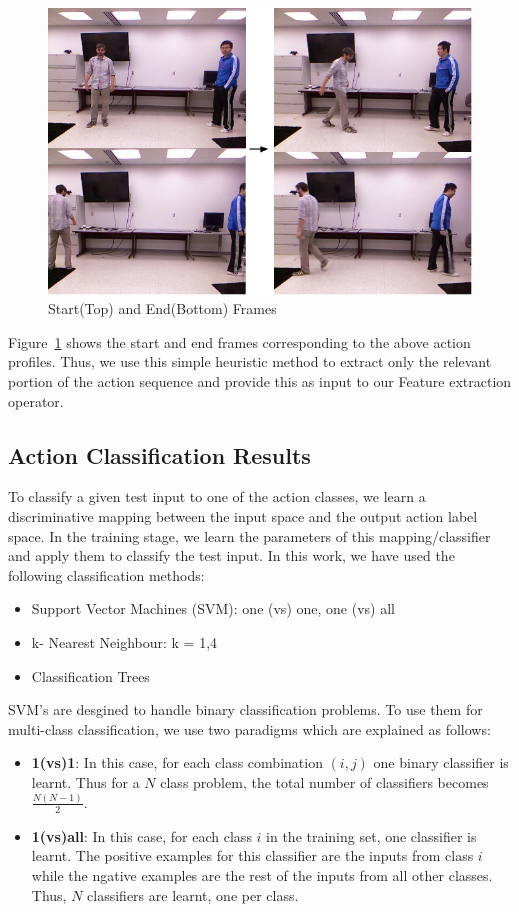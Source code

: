 \documentclass[10pt,twocolumn,letterpaper]{article}
\begin{document}
\begin{figure}[ht]

\includegraphics[scale=0.3]{first_last.png}
\caption{Start(Top) and End(Bottom) Frames}
\label{Fig:top_bot}
\end{figure}

Figure~\ref{Fig:top_bot} shows the start and end frames corresponding to the above action profiles. Thus, we use this simple heuristic method to extract only the relevant portion of the action sequence and provide this as input to our Feature extraction operator. 


\subsection{Action Classification Results}
To classify a given test input to one of the action classes, we learn a discriminative mapping between the input space and the output action label space. In the training stage, we learn the parameters of this mapping/classifier and apply them to classify the test input. In this work, we have used the following classification methods:
\begin{itemize}
\item Support Vector Machines (SVM): one (vs) one, one (vs) all 
\item k- Nearest Neighbour: k = 1,4
\item Classification Trees
\end{itemize}

SVM's are desgined to handle binary classification problems. To use them for multi-class classification, we use two paradigms which are explained as follows:
\begin{itemize}
\item \textbf{1(vs)1}: In this case, for each class combination $(i,j)$ one binary classifier is learnt. Thus for a $N$ class problem, the total number of classifiers becomes $\frac{N(N-1)}{2}$. 

\item \textbf{1(vs)all}: In this case, for each class $i$ in the training set, one classifier is learnt. The positive examples for this classifier are the inputs from class $i$ while the ngative examples are the rest of the inputs from all other classes. Thus, $N$ classifiers are learnt, one per class. 
\end{itemize}
\end{document}
